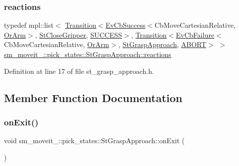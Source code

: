 \subsubsection{\texorpdfstring{reactions}{reactions}}
{\footnotesize\ttfamily typedef mpl\+::list$<$ \hyperlink{classsmacc_1_1Transition}{Transition}$<$\hyperlink{structsmacc_1_1EvCbSuccess}{Ev\+Cb\+Success}$<$Cb\+Move\+Cartesian\+Relative, \hyperlink{classsm__moveit__4_1_1OrArm}{Or\+Arm}$>$, \hyperlink{structsm__moveit__4_1_1pick__states_1_1StCloseGripper}{St\+Close\+Gripper}, \hyperlink{structsmacc_1_1default__transition__tags_1_1SUCCESS}{S\+U\+C\+C\+E\+SS}$>$, \hyperlink{classsmacc_1_1Transition}{Transition}$<$\hyperlink{structsmacc_1_1EvCbFailure}{Ev\+Cb\+Failure}$<$Cb\+Move\+Cartesian\+Relative, \hyperlink{classsm__moveit__4_1_1OrArm}{Or\+Arm}$>$, \hyperlink{structsm__moveit__4_1_1pick__states_1_1StGraspApproach}{St\+Grasp\+Approach}, \hyperlink{structsmacc_1_1default__transition__tags_1_1ABORT}{A\+B\+O\+RT}$>$ $>$ \hyperlink{structsm__moveit__4_1_1pick__states_1_1StGraspApproach_aac5e47f890c8f87966602b2a034d7541}{sm\+\_\+moveit\+\_\+::pick\+\_\+states\+::\+St\+Grasp\+Approach\+::reactions}}



Definition at line 17 of file st\+\_\+grasp\+\_\+approach.\+h.



\subsection{Member Function Documentation}
\mbox{\label{structsm__moveit__4_1_1pick__states_1_1StGraspApproach_a9af143a8b0acd0700670e700127776fd}} 
\subsubsection{\texorpdfstring{on\+Exit()}{onExit()}}
{\footnotesize\ttfamily void sm\+\_\+moveit\+\_\+::pick\+\_\+states\+::\+St\+Grasp\+Approach\+::on\+Exit (\begin{DoxyParamCaption}\item[{\hyperlink{structsmacc_1_1default__transition__tags_1_1ABORT}{A\+B\+O\+RT}}]{ }\end{DoxyParamCaption})\hspace{0.3cm}{\ttfamily [inline]}}



